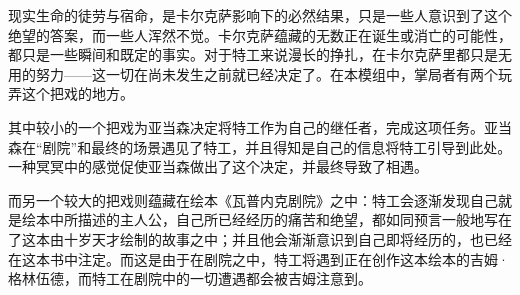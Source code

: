现实生命的徒劳与宿命，是卡尔克萨影响下的必然结果，只是一些人意识到了这个绝望的答案，而一些人浑然不觉。卡尔克萨蕴藏的无数正在诞生或消亡的可能性，都只是一些瞬间和既定的事实。对于特工来说漫长的挣扎，在卡尔克萨里都只是无用的努力——这一切在尚未发生之前就已经决定了。在本模组中，掌局者有两个玩弄这个把戏的地方。

其中较小的一个把戏为亚当森决定将特工作为自己的继任者，完成这项任务。亚当森在“剧院”和最终的场景遇见了特工，并且得知是自己的信息将特工引导到此处。一种冥冥中的感觉促使亚当森做出了这个决定，并最终导致了相遇。

而另一个较大的把戏则蕴藏在绘本《瓦普内克剧院》之中：特工会逐渐发现自己就是绘本中所描述的主人公，自己所已经经历的痛苦和绝望，都如同预言一般地写在了这本由十岁天才绘制的故事之中；并且他会渐渐意识到自己即将经历的，也已经在这本书中注定。而这是由于在剧院之中，特工将遇到正在创作这本绘本的吉姆·格林伍德，而特工在剧院中的一切遭遇都会被吉姆注意到。
